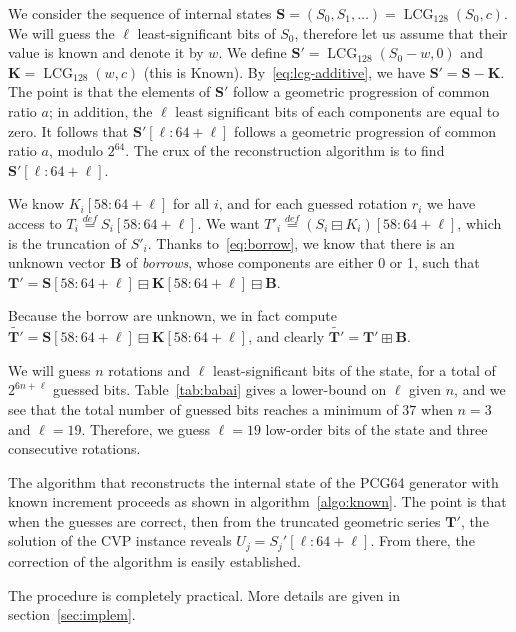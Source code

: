 \documentclass[preprint,svgnames]{iacrtrans}
\DeclareMathOperator{\LCG}{LCG}
\begin{document}
We consider the sequence of internal states
$\mathbf{S} = (S_0, S_1, \dots) = \LCG_{128}(S_0, c)$. We will guess the $\ell$
least-significant bits of $S_0$, therefore let us assume that their value is
known and denote it by $w$. We define $\mathbf{S}' = \LCG_{128}(S_0 - w, 0)$ and
$\mathbf{K} = \LCG_{128}(w, c)$ (this is Known). By~\eqref{eq:lcg-additive}, we
have $\mathbf{S}' = \mathbf{S} - \mathbf{K}$. The point is that the elements of
$\mathbf{S}'$ follow a geometric progression of common ratio $a$; in addition,
the $\ell$ least significant bits of each components are equal to zero. It
follows that $\mathbf{S}'[\ell:64+\ell]$ follows a geometric progression of
common ratio $a$, modulo $2^{64}$. The crux of the reconstruction algorithm is
to find $\mathbf{S}'[\ell:64+\ell]$.

We know $K_i[58:64+\ell]$ for all $i$, and for each guessed rotation $r_i$ we
have access to $T_i \stackrel{def}{=} S_i[58:64+\ell]$.  We want
$T'_i \stackrel{def}{=} (S_i \boxminus K_i)[58:64+\ell]$, which is the
truncation of $S'_i$. Thanks to~\eqref{eq:borrow}, we know that there is an
unknown vector $\mathbf{B}$ of \emph{borrows}, whose components are either 0 or
1, such that
$\mathbf{T'} = \mathbf{S}[58:64+\ell] \boxminus \mathbf{K}[58:64+\ell] \boxminus
\mathbf{B}$.

Because the borrow are unknown, we in fact compute
$\widetilde{\mathbf{T}'} = \mathbf{S}[58:64+\ell] \boxminus
\mathbf{K}[58:64+\ell]$, and clearly
$\widetilde{\mathbf{T}'} = \mathbf{T}' \boxplus \mathbf{B}$.

We will guess $n$ rotations and $\ell$ least-significant bits of the state, for
a total of $2^{6n + \ell}$ guessed bits. Table~\ref{tab:babai} gives a
lower-bound on $\ell$ given $n$, and we see that the total number of guessed
bits reaches a minimum of $37$ when $n=3$ and $\ell=19$. Therefore, we guess
$\ell = 19$ low-order bits of the state and three consecutive rotations.

The algorithm that reconstructs the internal state of the \textsf{PCG64}
generator with known increment proceeds as shown in
algorithm~\ref{algo:known}. The point is that when the guesses are correct, then
from the truncated geometric series $\mathbf{T'}$, the solution of the CVP
instance reveals $U_j = S_j'[\ell:64+\ell]$. From there, the correction of the
algorithm is easily established.

The procedure is completely practical. More details are given in section~\ref{sec:implem}.
\end{document}
